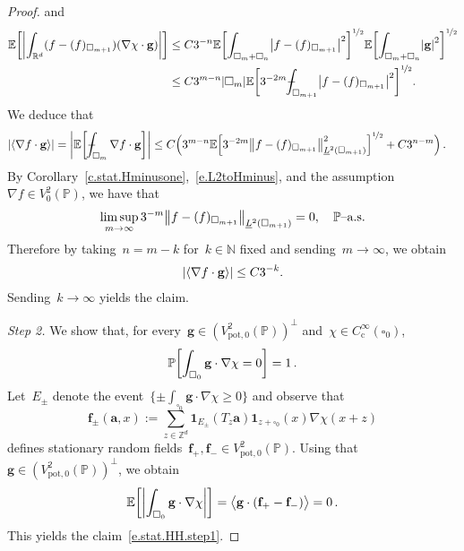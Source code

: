 \documentclass[11pt,twoside]{article} %
\let\oldsquare\square %
\renewcommand{\square}{\oldsquare}
\numberwithin{equation}{section}
\theoremstyle{definition}
\let\originalleft\left
\let\originalright\right
\renewcommand{\left}{\mathopen{}\mathclose\bgroup\originalleft}
\renewcommand{\right}{\aftergroup\egroup\originalright}
\newcommand*{\N}{\ensuremath{\mathbb{N}}}
\newcommand*{\Zd}{\ensuremath{\mathbb{Z}^d}}
\newcommand*{\Rd}{\ensuremath{\mathbb{R}^d}}
\newcommand{\g}{\mathbf{g}}
\newcommand{\f}{\mathbf{f}}
\newcommand{\pot}{\mathrm{pot}}
\renewcommand{\a}{\mathbf{a}}
\newcommand{\cu}{\square}
\renewcommand{\P}{\mathbb{P}}
\newcommand{\E}{\mathbb{E}}
\newcommand{\indc}{\boldsymbol{1}}
\def\Xint#1{\mathchoice
{\XXint\displaystyle\textstyle{#1}}%
{\XXint\textstyle\scriptstyle{#1}}%
{\XXint\scriptstyle\scriptscriptstyle{#1}}%
{\XXint\scriptscriptstyle\scriptscriptstyle{#1}}%
\!\int}
\def\XXint#1#2#3{{\setbox0=\hbox{$#1{#2#3}{\int}$}
\vcenter{\hbox{$#2#3$}}\kern-.5\wd0}}
\def\fint{\Xint-}
\begin{document}
\begin{proof}
and
\begin{align*}
\E\left[
\left| \int_{\Rd} 
(f- (f)_{\cu_{m+1}} ) (\nabla \chi \cdot \g )
\right| \right]
&
\leq 
C3^{-n} 
\E\left[
\int_{\cu_m+\cu_n}
\left| f- (f)_{\cu_{m+1}} \right|^2 \right]^{\nicefrac12}
\E \left[ 
\int_{\cu_m+\cu_n}
\left| \g \right|^2 \right]^{\nicefrac12}
\\ & 
\leq
C3^{m-n} |\cu_m|
\E\biggl[
3^{-2m}
\fint_{\cu_{m+1}}
\left| f- (f)_{\cu_{m+1}} \right|^2 \biggr]^{\nicefrac12}.
\end{align*}
We deduce that 
\begin{align*}
\left| \left\langle \nabla f \cdot \g \right\rangle \right|
&
=
\biggl| \E\biggl[ \fint_{\cu_m} \nabla f \cdot \g \biggr] \biggr|
\leq 
C
\Bigl( 
3^{m-n}
\E\left[
3^{-2m}
\left\| 
f- (f)_{\cu_{m+1}} \right\|_{\underline{L}^2(\cu_{m+1})}^2 \right]^{\nicefrac12}
+
C 3^{n-m}
\Bigr)\,.
\end{align*}
By Corollary~\ref{c.stat.Hminusone},~\eqref{e.L2toHminus}, 
and the assumption~$\nabla f\in V^2_0(\P)$, we have that 
\begin{align*}
\limsup_{m\to \infty} 
3^{-m}
\left\| 
f- (f)_{\cu_{m+1}} \right\|_{\underline{L}^2(\cu_{m+1})}
=0, \quad
\mbox{$\P$--a.s.}
\end{align*}
Therefore by taking~$n=m-k$ for~$k\in\N$ fixed and sending~$m\to \infty$,
we obtain
\begin{align*}
\left| \left\langle \nabla f \cdot \g \right\rangle \right|
\leq 
C3^{-k}. 
\end{align*}
Sending~$k\to \infty$ yields the claim. 

\smallskip

\emph{Step 2.}
We show that, for every~$\g\in (V^2_{\pot,0}(\P))^\perp$ and~$\chi\in C^\infty_{\mathrm{c}}(\cu_0)$, 
\begin{equation}
\label{e.stat.HH.step1}
\P \left[ \int_{\cu_0} \g \cdot \nabla \chi =0 \right] = 1
\,. 
\end{equation}
Let~$E_\pm$ denote the event~$\{ \pm \int_{\cu_0} \g \cdot \nabla \chi \geq 0\}$ and observe that
\begin{equation}
\f_{\pm}(\a,x)
:=
\sum_{z\in\Zd} \indc_{E_{\pm}}(T_z\a) \indc_{z+\cu_0}(x) \nabla \chi(x+z)
\end{equation}
defines stationary random fields~$\f_+, \f_-\in V^2_{\pot,0}(\P)$. Using that~$\g\in (V^2_{\pot,0}(\P))^\perp$, we obtain 
\begin{equation}
\E \left[ \biggl| \int_{\cu_0} \g\cdot \nabla \chi \biggr| \right]
=
\bigl\langle \g \cdot (\f_{+}- \f_{-}) \bigr\rangle
=
0
\,. 
\end{equation}
This yields the claim~\eqref{e.stat.HH.step1}. 


\end{proof}
\end{document}
